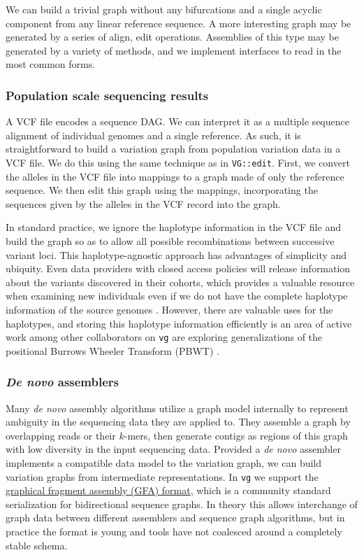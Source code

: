 \documentclass{article}
\begin{document}
We can build a trivial graph without any bifurcations and a single acyclic component from any linear reference sequence.
A more interesting graph may be generated by a series of align, edit operations.
Assemblies of this type may be generated by a variety of methods, and we implement interfaces to read in the most common forms.

\subsubsection{Population scale sequencing results}

A VCF file encodes a sequence DAG.
We can interpret it as a multiple sequence alignment of individual genomes and a single reference.
As such, it is straightforward to build a variation graph from population variation data in a VCF file.
We do this using the same technique as in {\tt VG::edit}.
First, we convert the alleles in the VCF file into mappings to a graph made of only the reference sequence. 
We then edit this graph using the mappings, incorporating the sequences given by the alleles in the VCF record into the graph. 

In standard practice, we ignore the haplotype information in the VCF file and build the graph so as to allow all possible recombinations between successive variant loci.
This haplotype-agnostic approach has advantages of simplicity and ubiquity.
Even data providers with closed access policies will release information about the variants discovered in their cohorts, which provides a valuable resource when examining new individuals even if we do not have the complete haplotype information of the source genomes \cite{exac2015}.
However, there are valuable uses for the haplotypes, and storing this haplotype information efficiently is an area of active work among other collaborators on {\tt vg} are exploring generalizations of the positional Burrows Wheeler Transform (PBWT) \cite{durbin2014}.

\subsubsection{\emph{De novo} assemblers}

Many \emph{de novo} assembly algorithms utilize a graph model internally to represent ambiguity in the sequencing data they are applied to.
They assemble a graph by overlapping reads or their $k$-mers, then generate contigs as regions of this graph with low diversity in the input sequencing data.
Provided a \emph{de novo} assembler implements a compatible data model to the variation graph, we can build variation graphs from intermediate representations.
In {\tt vg} we support the \href{https://github.com/pmelsted/GFA-spec}{graphical fragment assembly (GFA) format}, which is a community standard serialization for bidirectional sequence graphs.
In theory this allows interchange of graph data between different assemblers and sequence graph algorithms, but in practice the format is young and tools have not coalesced around a completely stable schema.
\end{document}
